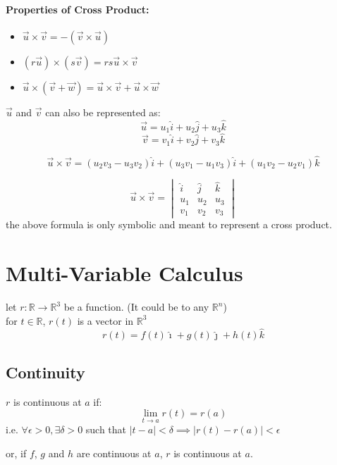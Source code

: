 \documentclass{article}
\begin{document}
\paragraph*{Properties of Cross Product: }
\begin{itemize}
    \item $\vec{u} \times \vec{v} = - (\vec{v} \times \vec{u})$
    \item $(r\vec{u}) \times (s \vec{v}) = rs \vec{u} \times \vec{v}$
    \item $ \vec{u} \times (\vec{v} + \vec{w}) = \vec{u} \times \vec{v} + \vec{u} \times \vec{w}$
\end{itemize}

$\vec{u}$ and $\vec{v}$ can also be represented as: 
\[ \vec{u} = u_1 \hat{i} + u_2 \hat{j} + u_3 \hat{k}\]
\[ \vec{v} = v_1 \hat{i} + v_2 \hat{j} + v_3 \hat{k}\]

\[\vec{u} \times \vec{v} = (u_2 v_3 - u_3 v_2)\hat{i} + (u_3 v_1 - u_1 v_3)\hat{i} + (u_1 v_2 - u_2 v_1)\hat{k}\]

\[\vec{u} \times \vec{v} = \begin{vmatrix}
    \hat{i} & \hat{j} & \hat{k} \\
    u_1 & u_2 & u_3\\
    v_1 & v_2 & v_3
\end{vmatrix}
\]
the above formula is only symbolic and meant to represent a cross product.

\section{Multi-Variable Calculus}

let $r: \mathbb{R} \rightarrow \mathbb{R}^3$ be a function.
(It could be to any $\mathbb{R}^n$)\\
for $t \in \mathbb{R}$, $r(t)$ is a vector in $\mathbb{R}^3$\\
\[r(t) = f(t)\hat{\imath} + g(t)\hat{\jmath} + h(t)\hat{k}\]

\subsection{Continuity}
$r$ is continuous at $a$ if: 
\[\lim_{t \rightarrow a} r(t) = r(a)\]
i.e. $\forall \epsilon > 0, \exists \delta > 0$ such that $|t - a| < \delta \implies |r(t) - r(a)| < \epsilon$

or, if $f$, $g$ and $h$ are continuous at $a$, $r$ is continuous at $a$.
\end{document}
